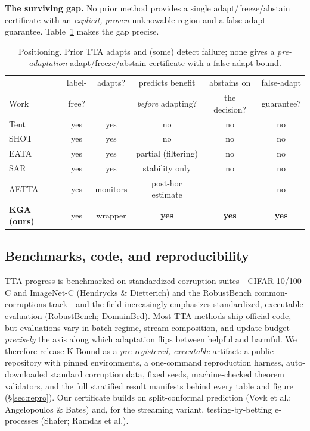 \documentclass[conference]{IEEEtran}
\theoremstyle{plain}
\theoremstyle{definition}
\begin{document}
\noindent\textbf{The surviving gap.} No prior method provides a single adapt/freeze/abstain
certificate with an \emph{explicit, proven} unknowable region and a false-adapt guarantee.
Table~\ref{tab:rel} makes the gap precise.

\begin{table}[t]\centering\small
\begin{tabular}{lccccc}
\toprule
 & label- & adapts? & predicts benefit & abstains on & false-adapt \\
Work & free? & & \emph{before} adapting? & the decision? & guarantee? \\
\midrule
Tent & yes & yes & no & no & no \\
SHOT & yes & yes & no & no & no \\
EATA & yes & yes & partial (filtering) & no & no \\
SAR & yes & yes & stability only & no & no \\
AETTA & yes & monitors & post-hoc estimate & --- & no \\
\textbf{KGA (ours)} & yes & wrapper & \textbf{yes} & \textbf{yes} & \textbf{yes} \\
\bottomrule
\end{tabular}
\caption{Positioning. Prior TTA adapts and (some) detect failure; none gives a
\emph{pre-adaptation} adapt/freeze/abstain certificate with a false-adapt bound.}
\label{tab:rel}
\end{table}

\subsection{Benchmarks, code, and reproducibility}
TTA progress is benchmarked on standardized corruption suites---CIFAR-10/100-C and ImageNet-C
(Hendrycks \& Dietterich) and the RobustBench common-corruptions track---and the field
increasingly emphasizes standardized, executable evaluation (RobustBench; DomainBed). Most TTA
methods ship official code, but evaluations vary in batch regime, stream composition, and update
budget---\emph{precisely} the axis along which adaptation flips between helpful and harmful. We
therefore release K-Bound as a \emph{pre-registered, executable} artifact: a public repository
with pinned environments, a one-command reproduction harness, auto-downloaded standard corruption
data, fixed seeds, machine-checked theorem validators, and the full stratified result manifests
behind every table and figure (\S\ref{sec:repro}). Our certificate builds on split-conformal
prediction (Vovk et al.; Angelopoulos \& Bates) and, for the streaming variant, testing-by-betting
e-processes (Shafer; Ramdas et al.).
\end{document}
